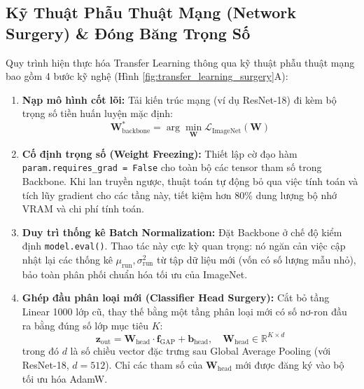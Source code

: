 \documentclass[12pt,a4paper]{report}
\begin{document}
\subsection{Kỹ Thuật Phẫu Thuật Mạng (Network Surgery) \& Đóng Băng Trọng Số}
Quy trình hiện thực hóa Transfer Learning thông qua kỹ thuật phẫu thuật mạng bao gồm 4 bước kỹ nghệ (Hình \ref{fig:transfer_learning_surgery}A):
\begin{enumerate}[leftmargin=*]
    \item \textbf{Nạp mô hình cốt lõi:} Tải kiến trúc mạng (ví dụ ResNet-18) đi kèm bộ trọng số tiền huấn luyện mặc định:
    \begin{equation}
        \mathbf{W}^*_{\text{backbone}} = \arg\min_{\mathbf{W}} \mathcal{L}_{\text{ImageNet}}(\mathbf{W})
    \end{equation}
    \item \textbf{Cố định trọng số (Weight Freezing):} Thiết lập cờ đạo hàm \texttt{param.requires\_grad = False} cho toàn bộ các tensor tham số trong Backbone. Khi lan truyền ngược, thuật toán tự động bỏ qua việc tính toán và tích lũy gradient cho các tầng này, tiết kiệm hơn $80\%$ dung lượng bộ nhớ VRAM và chi phí tính toán.
    \item \textbf{Duy trì thống kê Batch Normalization:} Đặt Backbone ở chế độ kiểm định \texttt{model.eval()}. Thao tác này cực kỳ quan trọng: nó ngăn cản việc cập nhật lại các thống kê $\mu_{\text{run}}, \sigma^2_{\text{run}}$ từ tập dữ liệu mới (vốn có số lượng mẫu nhỏ), bảo toàn phân phối chuẩn hóa tối ưu của ImageNet.
    \item \textbf{Ghép đầu phân loại mới (Classifier Head Surgery):} Cắt bỏ tầng Linear 1000 lớp cũ, thay thế bằng một tầng phân loại mới có số nơ-ron đầu ra bằng đúng số lớp mục tiêu $K$:
    \begin{equation}
        \mathbf{z}_{\text{out}} = \mathbf{W}_{\text{head}} \cdot \mathbf{f}_{\text{GAP}} + \mathbf{b}_{\text{head}}, \quad \mathbf{W}_{\text{head}} \in \mathbb{R}^{K \times d}
    \end{equation}
    trong đó $d$ là số chiều vector đặc trưng sau Global Average Pooling (với ResNet-18, $d = 512$). Chỉ các tham số của $\mathbf{W}_{\text{head}}$ mới được đăng ký vào bộ tối ưu hóa AdamW.
\end{enumerate}
\end{document}
